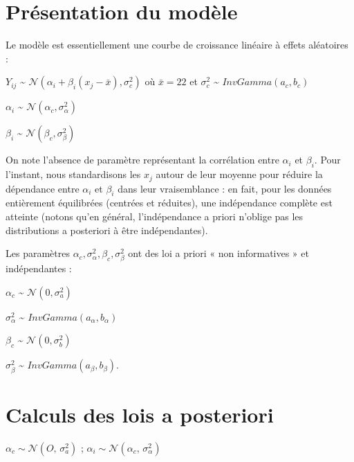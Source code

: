 \documentclass[
]{article}
\begin{document}
\hypertarget{pruxe9sentation-du-moduxe8le}{%
\section{Présentation du modèle}\label{pruxe9sentation-du-moduxe8le}}

Le modèle est essentiellement une courbe de croissance linéaire à effets
aléatoires :

\(Y_{ij}\) \textasciitilde{}
\(\mathcal N(\alpha_i + \beta_i(x_j - \bar x), \sigma_c ^2)\) où
\(\bar x = 22\) et \(\sigma_c ^2\) \textasciitilde{}
\(InvGamma(a_c,b_c)\)

\(\alpha_i\) \textasciitilde{}
\(\mathcal N(\alpha_c,\sigma_{\alpha}^2)\)

\(\beta_i\) \textasciitilde{} \(\mathcal N(\beta_c,\sigma_{\beta}^2)\)

On note l'absence de paramètre représentant la corrélation entre
\(\alpha_i\) et \(\beta_i\). Pour l'instant, nous standardisons les
\(x_j\) autour de leur moyenne pour réduire la dépendance entre
\(\alpha_i\) et \(\beta_i\) dans leur vraisemblance : en fait, pour les
données entièrement équilibrées (centrées et réduites), une indépendance
complète est atteinte (notons qu'en général, l'indépendance a priori
n'oblige pas les distributions a posteriori à être indépendantes).

Les paramètres
\(\alpha_c, \sigma_{\alpha}^2, \beta_c, \sigma_{\beta}^2\) ont des loi a
priori « non informatives » et indépendantes :

\(\alpha_c\) \textasciitilde{} \(\mathcal N(0,\sigma_a^2)\)

\(\sigma_{\alpha}^2\) \textasciitilde{}
\(InvGamma(a_{\alpha},b_{\alpha})\)

\(\beta_c\) \textasciitilde{} \(\mathcal N(0,\sigma_b^2)\)

\(\sigma_{\beta}^2\) \textasciitilde{}
\(InvGamma(a_{\beta},b_{\beta})\).

\hypertarget{calculs-des-lois-a-posteriori}{%
\section{Calculs des lois a
posteriori}\label{calculs-des-lois-a-posteriori}}

\(\alpha_{c} \sim \mathcal{N}(O,\,\sigma_{a}^{2})\) ;
\(\alpha_{i} \sim \mathcal{N}(\alpha_{c},\,\sigma_{\alpha}^{2})\)
\end{document}
